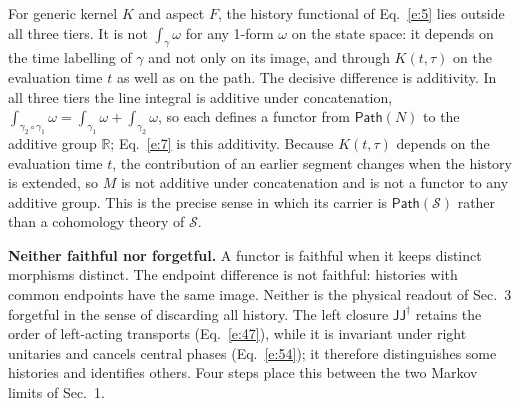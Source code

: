 \documentclass[10pt]{article}
\newcommand{\sJ}{\mathsf{J}}
\newcommand{\Path}{\mathsf{Path}}
\begin{document}
For generic kernel $K$ and aspect $F$, the history functional of Eq.~\eqref{e:5} lies outside all three tiers. It is not $\int_\gamma\omega$ for any 1-form $\omega$ on the state space: it depends on the time labelling of $\gamma$ and not only on its image, and through $K(t,\tau)$ on the evaluation time $t$ as well as on the path. The decisive difference is additivity. In all three tiers the line integral is additive under concatenation, $\int_{\gamma_2\circ\gamma_1}\omega=\int_{\gamma_1}\omega+\int_{\gamma_2}\omega$, so each defines a functor from $\Path(N)$ to the additive group $\mathbb R$; Eq.~\eqref{e:7} is this additivity. Because $K(t,\tau)$ depends on the evaluation time $t$, the contribution of an earlier segment changes when the history is extended, so $M$ is not additive under concatenation and is not a functor to any additive group. This is the precise sense in which its carrier is $\Path(\mathcal S)$ rather than a cohomology theory of $\mathcal S$.

\smallskip
\noindent\textbf{Neither faithful nor forgetful.} A functor is faithful when it keeps distinct morphisms distinct. The endpoint difference is not faithful: histories with common endpoints have the same image. Neither is the physical readout of Sec.~3 forgetful in the sense of discarding all history. The left closure $\sJ\sJ^\dagger$ retains the order of left-acting transports (Eq.~\eqref{e:47}), while it is invariant under right unitaries and cancels central phases (Eq.~\eqref{e:54}); it therefore distinguishes some histories and identifies others. Four steps place this between the two Markov limits of Sec.~1.
\end{document}

